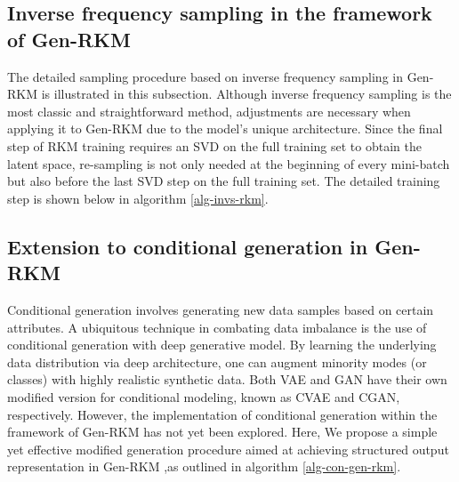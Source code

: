 \subsection{Inverse frequency sampling in the framework of Gen-RKM}
The detailed sampling procedure based on inverse frequency sampling in Gen-RKM is illustrated in this subsection. Although inverse frequency sampling is the most classic and straightforward method, adjustments are necessary when applying it to Gen-RKM due to the model’s unique architecture. Since the final step of RKM training requires an SVD on the full training set to obtain the latent space, re-sampling is not only needed at the beginning of every mini-batch but also before the last SVD step on the full training set. The detailed training step is shown below in algorithm \ref{alg-invs-rkm}.



\subsection{Extension to conditional generation in Gen-RKM}
\label{subsec-methods-congen}
Conditional generation involves generating new data samples based on certain attributes. A ubiquitous technique in combating data imbalance is the use of conditional generation with deep generative model. By learning the underlying data distribution via deep architecture, one can augment minority modes (or classes) with highly realistic synthetic data. Both VAE and GAN have their own modified version for conditional modeling, known as CVAE\cite{sohnLearningStructuredOutput2015} and CGAN\cite{mirzaConditionalGenerativeAdversarial2014}, respectively. However, the implementation of conditional generation within the framework of Gen-RKM has not yet been explored. Here, We propose a simple yet effective modified generation procedure aimed at achieving structured output representation in Gen-RKM ,as outlined in algorithm \ref{alg-con-gen-rkm}.

